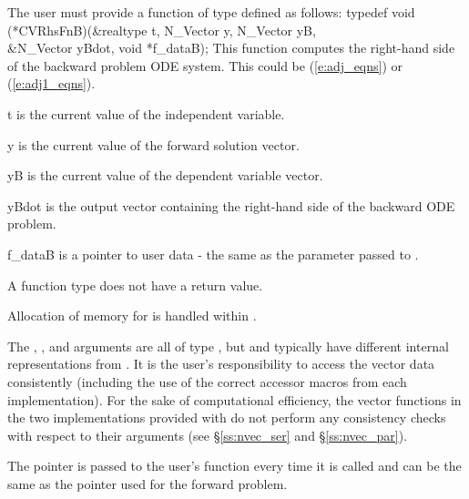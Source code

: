 The user must provide a function of type  defined as follows:
{
  typedef void (*CVRhsFnB)(&realtype t, N\_Vector y, N\_Vector yB, \\
                           &N\_Vector yBdot, void *f\_dataB);
}
{
  This function computes the right-hand side of the backward problem ODE system.
  This could be (\ref{e:adj_eqns}) or (\ref{e:adj1_eqns}).
}
{
  \begin{args}[f\_dataB]
  \item[t]
    is the current value of the independent variable.
  \item[y]
    is the current value of the forward solution vector.
  \item[yB]
    is the current value of the dependent variable vector.
  \item[yBdot]
    is the output vector containing the right-hand side of the backward ODE problem.
  \item[f\_dataB]
    is a pointer to user data - the same as the       
    parameter passed to .   
  \end{args}
}
{
  A  function type does not have a return value.                        
}
{
  Allocation of memory for  is handled within {\cvodes}.

  The , , and  arguments are all of type ,
  but  and   typically have different internal representations
  from . It is the user's 
  responsibility to access the vector data consistently (including the use of the 
  correct accessor macros from each {\nvector} implementation). For the sake of 
  computational efficiency, the vector functions in the two {\nvector} implementations 
  provided with {\cvodes} do not perform any consistency checks with respect to their 
   arguments (see \S\ref{ss:nvec_ser} and \S\ref{ss:nvec_par}).

  The  pointer is passed to 
  the user's  function every time it is called and can be the same as the 
   pointer used for the forward problem.
}

